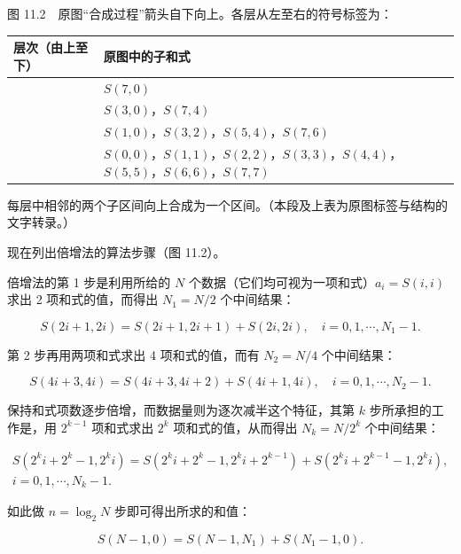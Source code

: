 图 11.2　原图``合成过程''箭头自下向上。各层从左至右的符号标签为：

{\def\LTcaptype{none} %
\begin{longtable}[]{@{}
  >{\raggedright\arraybackslash}p{}
  >{\raggedright\arraybackslash}p{}@{}}
\toprule\noalign{}
\begin{minipage}[b]{\linewidth}\raggedright
层次（由上至下）
\end{minipage} & \begin{minipage}[b]{\linewidth}\raggedright
原图中的子和式
\end{minipage} \\
\midrule\noalign{}
\endhead
\bottomrule\noalign{}
\endlastfoot
1 & \(S(7,0)\) \\
2 & \(S(3,0)\)，\(S(7,4)\) \\
3 & \(S(1,0)\)，\(S(3,2)\)，\(S(5,4)\)，\(S(7,6)\) \\
4 & \(S(0,0)\)，\(S(1,1)\)，\(S(2,2)\)，\(S(3,3)\)，\(S(4,4)\)，\(S(5,5)\)，\(S(6,6)\)，\(S(7,7)\) \\
\end{longtable}
}

每层中相邻的两个子区间向上合成为一个区间。（本段及上表为原图标签与结构的文字转录。）

现在列出倍增法的算法步骤（图 11.2）。

倍增法的第 1 步是利用所给的 \(N\) 个数据（它们均可视为一项和式）\(a_i=S(i,i)\) 求出 2 项和式的值，而得出 \(N_1=N/2\) 个中间结果：

\[
S(2i+1,2i)=S(2i+1,2i+1)+S(2i,2i),\quad i=0,1,\cdots,N_1-1.
\]

第 2 步再用两项和式求出 4 项和式的值，而有 \(N_2=N/4\) 个中间结果：

\[
S(4i+3,4i)=S(4i+3,4i+2)+S(4i+1,4i),\quad i=0,1,\cdots,N_2-1.
\]

保持和式项数逐步倍增，而数据量则为逐次减半这个特征，其第 \(k\) 步所承担的工作是，用 \(2^{k-1}\) 项和式求出 \(2^k\) 项和式的值，从而得出 \(N_k=N/2^k\) 个中间结果：

\[
\begin{gathered}
S(2^ki+2^k-1,2^ki)=S(2^ki+2^k-1,2^ki+2^{k-1})+S(2^ki+2^{k-1}-1,2^ki),\\
i=0,1,\cdots,N_k-1.
\end{gathered}
\tag{11.2.3}
\]

如此做 \(n=\log_2 N\) 步即可得出所求的和值：

\[
S(N-1,0)=S(N-1,N_1)+S(N_1-1,0).
\]

